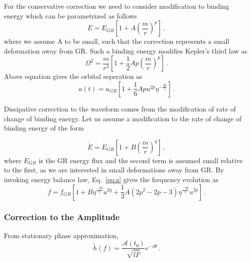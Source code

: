 \documentclass[11pt]{article}
\begin{document}
\hspace*{15.5pt}For the conservative correction we need to consider modification to binding energy which can be parametrized as follows\cite{Chatziioannou:2012rf}
 \begin{equation}
 E=E_{GR}\left[1+A(\frac{m}{r})^p\right]\,,
 \end{equation}
 where we assume A to be small, such that the correction represents a small deformation away from GR. Such a binding energy modifies Kepler’s third law as
 \begin{equation}
 \Omega^2=\frac{m}{r^3} \left[1+\frac{1}{2} Ap\left(\frac{m}{r}\right)^p\right]\,.
 \end{equation}
  Above equation gives the orbital seperation as
 \begin{equation}\label{eq:g}
 a(t)=a_{GR}\left[1+\frac{1}{6}Apu^{2p}\eta^{-\frac{2p}{5}}\right]\,.
 \end{equation}
 
 \hspace*{15.5pt}Dissipative correction to the waveform comes from the modification of rate of change of binding energy. Let us assume a modification to the rate of change of binding energy of the form\cite{Chatziioannou:2012rf}
 
 \begin{equation}\label{eq:a}
 \dot{E}=\dot{E}_{GR}\left[1+B(\frac{m}{r})^q\right]\,,
 \end{equation}
 where $\dot{E}_{GR}$ is the GR energy flux and the second term is assumed small relative to the first, as we are interested in small deformations away from GR. By invoking energy balance law, Eq.~\eqref{eq:a} gives the frequency evolution as 
 \begin{equation}\label{eq:f}
 \dot{f}=\dot{f}_{GR}\left[1+B\eta^\frac{-2q}{5} u^{2q}+\frac{1}{3}A(2p^2-2p-3)\eta^{\frac{-2p}{5}}u^{2p}\right]\,.
 \end{equation}\label{eq:e}
 
 \subsubsection*{Correction to the Amplitude}
 
 \hspace{15.5pt}From stationary phase approximation\cite{Yunes:2009yz},
 \begin{equation}\label{eq:b}
 \tilde{h}(f)=\frac{\mathcal{A}(t_0)}{\sqrt{l\dot{F}}}e^{-i\Psi}\,.
 \end{equation}
 
\end{document}
